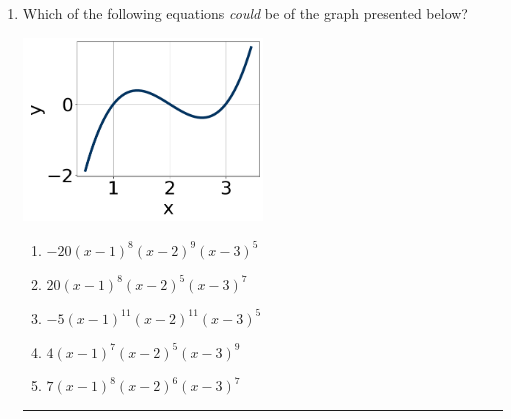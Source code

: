\documentclass[14pt]{extbook}
\newcommand{\litem}[1]{\item#1\hspace*{-1cm}\rule{\textwidth}{0.4pt}}
\begin{document}
\begin{enumerate}
{\begin{enumerate}[label=\Alph*.]
\end{enumerate} }
\litem{
Which of the following equations \textit{could} be of the graph presented below?
\begin{center}
    \includegraphics[width=0.5\textwidth]{../Figures/polyGraphToFunctionB.png}
\end{center}
\begin{enumerate}[label=\Alph*.]
\item \( -20(x - 1)^{8} (x - 2)^{9} (x - 3)^{5} \)
\item \( 20(x - 1)^{8} (x - 2)^{5} (x - 3)^{7} \)
\item \( -5(x - 1)^{11} (x - 2)^{11} (x - 3)^{5} \)
\item \( 4(x - 1)^{7} (x - 2)^{5} (x - 3)^{9} \)
\item \( 7(x - 1)^{8} (x - 2)^{6} (x - 3)^{7} \)


\end{enumerate}}
\end{enumerate}
\end{document}
